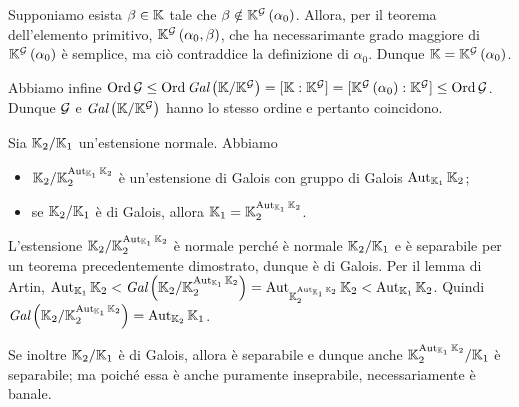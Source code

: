 \par Supponiamo esista $\beta \in \Field$ tale che $\beta \notin \FieldAdjunction{\Fixed{\Field}{\Group}}{\alpha_0}$. Allora, per il teorema dell'elemento primitivo, $\FieldAdjunction{\Fixed{\Field}{\Group}}{\alpha_0,\beta}$, che ha necessarimante grado maggiore di $\FieldAdjunction{\Fixed{\Field}{\Group}}{\alpha_0}$ \`e semplice, ma ci\`o contraddice la definizione di $\alpha_0$. Dunque $\Field = \FieldAdjunction{\Fixed{\Field}{\Group}}{\alpha_0}$.
\par Abbiamo infine $\GroupOrder{\Group} \leq \GroupOrder{\GaloisGroup{\Field}{\Fixed{\Field}{\Group}}} = \FieldDegree{\Field}{\Fixed{\Field}{\Group}} = \FieldDegree{\FieldAdjunction{\Fixed{\Field}{\Group}}{\alpha_0}}{\Fixed{\Field}{\Group}} \leq \GroupOrder{\Group}$. Dunque $\Group$ e $\GaloisGroup{\Field}{\Fixed{\Field}{\Group}}$ hanno lo stesso ordine e pertanto coincidono. \EndProof
\begin{Corollary}
	Sia $\FieldExtension{\Field_2}{\Field_1}$ un'estensione normale. Abbiamo
	\begin{itemize}
		\item $\FieldExtension{\Field_2}{\Fixed{\Field_2}{\RelativeAutomorphisms{\Field_2}{\Field_1}}}$ \`e un'estensione di Galois con gruppo di Galois $\RelativeAutomorphisms{\Field_2}{\Field_1}$;
		\item se $\FieldExtension{\Field_2}{\Field_1}$ \`e di Galois, allora $\Field_1 = \Fixed{\Field_2}{\RelativeAutomorphisms{\Field_2}{\Field_1}}$.
	\end{itemize}
\end{Corollary}
\Proof L'estensione $\FieldExtension{\Field_2}{\Fixed{\Field_2}{\RelativeAutomorphisms{\Field_2}{\Field_1}}}$ \`e normale perch\'e \`e normale $\FieldExtension{\Field_2}{\Field_1}$ e \`e separabile per un teorema precedentemente dimostrato, dunque \`e di Galois. Per il lemma di Artin, $\RelativeAutomorphisms{\Field_2}{\Field_1} \IsSubgroup \GaloisGroup{\Field_2}{\Fixed{\Field_2}{\RelativeAutomorphisms{\Field_2}{\Field_1}}} = \RelativeAutomorphisms{\Field_2}{\Fixed{\Field_2}{\RelativeAutomorphisms{\Field_2}{\Field_1}}} \IsSubgroup \RelativeAutomorphisms{\Field_2}{\Field_1}$. Quindi $\GaloisGroup{\Field_2}{\Fixed{\Field_2}{\RelativeAutomorphisms{\Field_2}{\Field_1}}} = \RelativeAutomorphisms{\Field_1}{\Field_2}$.
\par Se inoltre $\FieldExtension{\Field_2}{\Field_1}$ \`e di Galois, allora \`e separabile e dunque anche $\FieldExtension{\Fixed{\Field_2}{\RelativeAutomorphisms{\Field_2}{\Field_1}}}{\Field_1}$ \`e separabile; ma poich\'e essa \`e anche puramente inseprabile, necessariamente \`e banale. \EndProof
